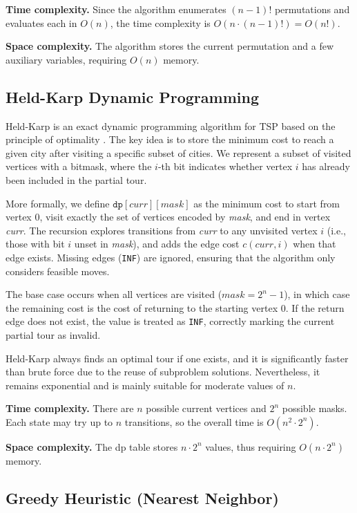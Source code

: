 \textbf{Time complexity.} Since the algorithm enumerates $(n - 1)!$ permutations and evaluates each in $O(n)$, the time complexity is $O(n \cdot (n - 1)!) = O(n!)$.

\textbf{Space complexity.} The algorithm stores the current permutation and a few auxiliary variables, requiring $O(n)$ memory.

\subsection{Held-Karp Dynamic Programming}

Held-Karp is an exact dynamic programming algorithm for TSP based on the principle of optimality \cite{bellman1962,gfg_tsp_dp}. The key idea is to store the minimum cost to reach a given city after visiting a specific subset of cities. We represent a subset of visited vertices with a bitmask, where the $i$-th bit indicates whether vertex $i$ has already been included in the partial tour.

More formally, we define $\texttt{dp}[\textit{curr}][\textit{mask}]$ as the minimum cost to start from vertex 0, visit exactly the set of vertices encoded by \textit{mask}, and end in vertex \textit{curr}. The recursion explores transitions from \textit{curr} to any unvisited vertex $i$ (i.e., those with bit $i$ unset in \textit{mask}), and adds the edge cost $c(\textit{curr}, i)$ when that edge exists. Missing edges (\texttt{INF}) are ignored, ensuring that the algorithm only considers feasible moves.

The base case occurs when all vertices are visited ($\textit{mask} = 2^n - 1$), in which case the remaining cost is the cost of returning to the starting vertex 0. If the return edge does not exist, the value is treated as \texttt{INF}, correctly marking the current partial tour as invalid.

Held-Karp always finds an optimal tour if one exists, and it is significantly faster than brute force due to the reuse of subproblem solutions. Nevertheless, it remains exponential and is mainly suitable for moderate values of $n$.

\textbf{Time complexity.} There are $n$ possible current vertices and $2^n$ possible masks. Each state may try up to $n$ transitions, so the overall time is $O(n^2 \cdot 2^n)$.

\textbf{Space complexity.} The dp table stores $n \cdot 2^n$ values, thus requiring $O(n \cdot 2^n)$ memory.

\subsection{Greedy Heuristic (Nearest Neighbor)}

